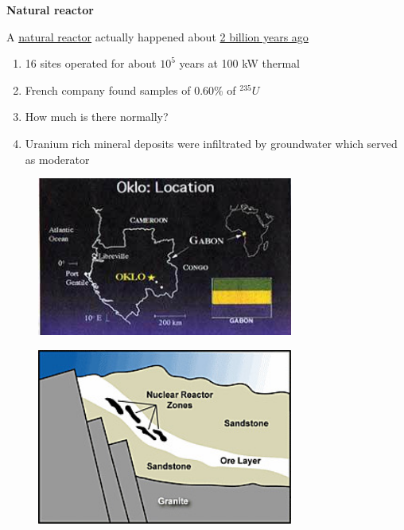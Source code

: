 \documentclass[aspectratio=1610,pdftex,dvipsnames,compress,xcolor={dvipsnames}]{beamer}
\begin{document}
\begin{frame}[plain]{}
    \centering\LARGE\textbf{Natural reactor}
\end{frame}


\addtocounter{framenumber}{-1} 
\begin{frame}{A \href{https://uidaho.pressbooks.pub/nuclearengineering/chapter/nuclear-fuel-cycle-system/}{natural reactor} actually happened about \href{https://uidaho.pressbooks.pub/nuclearengineering/chapter/neutronics/}{2 billion years ago}}
    \begin{enumerate}[series=outerlist,topsep=0pt,itemsep=21pt,leftmargin=*,label=(\arabic*)]
        \item[]16 sites operated for about $10^5$ years at 100 kW thermal
        \item[]French company found samples of 0.60\% of $^{235}U$
        \item[]How much is there normally?
        \item[]Uranium rich mineral deposits were infiltrated by groundwater which served as moderator
    \end{enumerate}
\end{frame}


\begin{frame}{}
    \begin{figure}
        \centering
        \includegraphics[width=0.75\textwidth]{oklo.location.jpg}
    \end{figure}
\end{frame}


\begin{frame}{}
    \begin{figure}
        \centering
        \includegraphics[width=0.75\textwidth]{oklo.jpg}
    \end{figure}
\end{frame}
\end{document}
